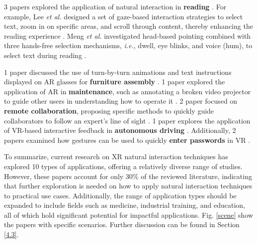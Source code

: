 \documentclass[review]{fcs}
\newcommand{\revise}[2]{\textcolor[rgb]{0,0,0}{#2}}
\begin{document}
3 papers explored the application of natural interaction in \textbf{reading} \cite{DBLP:conf/ismar/LeeHM22, DBLP:conf/ismar/MengXL22, DBLP:conf/ismar/XuMYSL22}. For example, Lee \textit{et al.} designed a set of gaze-based interaction strategies to select text, zoom in on specific areas, and scroll through content, thereby enhancing the reading experience \cite{DBLP:conf/ismar/LeeHM22}. Meng \textit{et al.} investigated head-based pointing combined with three hands-free selection mechanisms, \textit{i.e.}, dwell, eye blinks, and voice (hum), to select text during reading \cite{DBLP:conf/ismar/MengXL22}.


1 paper discussed the use of turn-by-turn animations and text instructions displayed on AR glasses for \textbf{furniture assembly} \cite{DBLP:conf/vr/YangQCSBLL24}. 1 paper explored the application of AR in \textbf{maintenance}, such as annotating a broken video projector to guide other users in understanding how to operate it \cite{DBLP:conf/vr/QuereMJWW24}. 2 paper focused on \textbf{remote collaboration}, proposing specific methods to quickly guide collaborators to follow an expert's line of sight \cite{DBLP:conf/vr/JingLB22, DBLP:journals/corr/abs-2405-18537}. 
1 paper explores the application of VR-based interactive feedback in \textbf{autonomous driving} \cite{DBLP:conf/chi/ElsharkawyAYAHK24}.
Additionally, 2 papers examined how gestures can be used to quickly \textbf{enter passwords} in VR \cite{DBLP:conf/ismar/SongDK22, DBLP:conf/vr/RuppGBK24}.

To summarize, current research on XR natural interaction techniques has explored 10 types of applications, offering a relatively diverse range of studies. However, these papers account for only 30\% of the reviewed literature, indicating that further exploration is needed on how to apply natural interaction techniques to practical use cases. Additionally, the range of application types should be expanded to include fields such as medicine, industrial training, and education, all of which hold significant potential for impactful applications. \revise{}{Fig. \ref{scene} show the papers with specific scenarios.} Further discussion can be found in Section \ref{4.3}.

\end{document}
